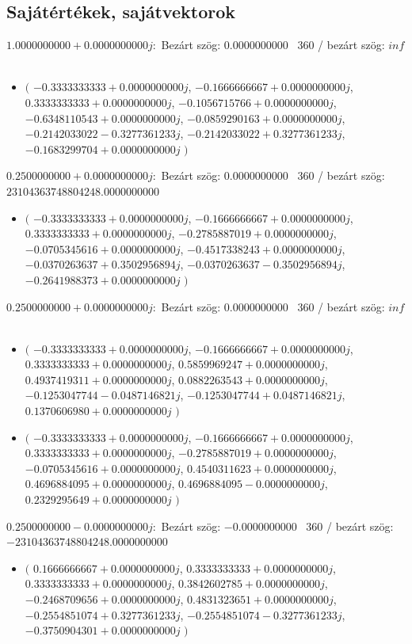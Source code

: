 \documentclass[14pt,a4paper]{article}
\begin{document}
\subsection{Sajátértékek, sajátvektorok}
$1.0000000000+0.0000000000j$:\
Bezárt szög: $0.0000000000$ \
360 / bezárt szög: $inf$\
\begin{itemize}
\item
$\big($
$-0.3333333333+0.0000000000j$, $-0.1666666667+0.0000000000j$, $0.3333333333+0.0000000000j$, $-0.1056715766+0.0000000000j$, $-0.6348110543+0.0000000000j$, $-0.0859290163+0.0000000000j$, $-0.2142033022-0.3277361233j$, $-0.2142033022+0.3277361233j$, $-0.1683299704+0.0000000000j$
$\big)$
\end{itemize}
$0.2500000000+0.0000000000j$:\
Bezárt szög: $0.0000000000$ \
360 / bezárt szög: $23104363748804248.0000000000$\
\begin{itemize}
\item
$\big($
$-0.3333333333+0.0000000000j$, $-0.1666666667+0.0000000000j$, $0.3333333333+0.0000000000j$, $-0.2785887019+0.0000000000j$, $-0.0705345616+0.0000000000j$, $-0.4517338243+0.0000000000j$, $-0.0370263637+0.3502956894j$, $-0.0370263637-0.3502956894j$, $-0.2641988373+0.0000000000j$
$\big)$
\end{itemize}
$0.2500000000+0.0000000000j$:\
Bezárt szög: $0.0000000000$ \
360 / bezárt szög: $inf$\
\begin{itemize}
\item
$\big($
$-0.3333333333+0.0000000000j$, $-0.1666666667+0.0000000000j$, $0.3333333333+0.0000000000j$, $0.5859969247+0.0000000000j$, $0.4937419311+0.0000000000j$, $0.0882263543+0.0000000000j$, $-0.1253047744-0.0487146821j$, $-0.1253047744+0.0487146821j$, $0.1370606980+0.0000000000j$
$\big)$
\item
$\big($
$-0.3333333333+0.0000000000j$, $-0.1666666667+0.0000000000j$, $0.3333333333+0.0000000000j$, $-0.2785887019+0.0000000000j$, $-0.0705345616+0.0000000000j$, $0.4540311623+0.0000000000j$, $0.4696884095+0.0000000000j$, $0.4696884095-0.0000000000j$, $0.2329295649+0.0000000000j$
$\big)$
\end{itemize}
$0.2500000000-0.0000000000j$:\
Bezárt szög: $-0.0000000000$ \
360 / bezárt szög: $-23104363748804248.0000000000$\
\begin{itemize}
\item
$\big($
$0.1666666667+0.0000000000j$, $0.3333333333+0.0000000000j$, $0.3333333333+0.0000000000j$, $0.3842602785+0.0000000000j$, $-0.2468709656+0.0000000000j$, $0.4831323651+0.0000000000j$, $-0.2554851074+0.3277361233j$, $-0.2554851074-0.3277361233j$, $-0.3750904301+0.0000000000j$
$\big)$
\end{itemize}
\end{document}
